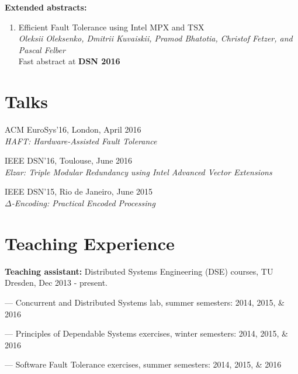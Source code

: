 \documentclass[letterpaper]{article}
\renewenvironment{itemize}{
  \begin{list}{}{
    \setlength{\leftmargin}{1.5em}
  }
}{
  \end{list}
}
\begin{document}
{\bf Extended abstracts:}

\begin{enumerate} [label= $\lbrack$\arabic*$\rbrack$, resume]

\item{Efficient Fault Tolerance using Intel MPX and TSX}\\
{\em Oleksii Oleksenko, {Dmitrii Kuvaiskii}, Pramod Bhatotia, Christof Fetzer, and Pascal Felber}\\
Fast abstract at {\bf DSN 2016}


\end{enumerate}


\section*{Talks}
\begin{itemize}
\item ACM EuroSys'16, London, April 2016\\
	{\em  HAFT: Hardware-Assisted Fault Tolerance}
\item IEEE DSN'16, Toulouse, June 2016\\
	{\em  Elzar: Triple Modular Redundancy using Intel Advanced Vector Extensions}
\item IEEE DSN'15, Rio de Janeiro, June 2015\\
{\em  $\Delta$-Encoding: Practical Encoded Processing}
\end{itemize}


\section*{Teaching Experience}

\begin{itemize}
\item {\bf Teaching assistant:} Distributed Systems Engineering (DSE) courses, TU Dresden, Dec 2013 - present.
\begin{itemize}
	\item --- Concurrent and Distributed Systems lab, summer semesters: 2014, 2015, \& 2016
	\item --- Principles of Dependable Systems exercises, winter semesters: 2014, 2015, \& 2016
	\item --- Software Fault Tolerance exercises, summer semesters: 2014, 2015, \& 2016
\end{itemize}
\end{itemize}
\end{document}
